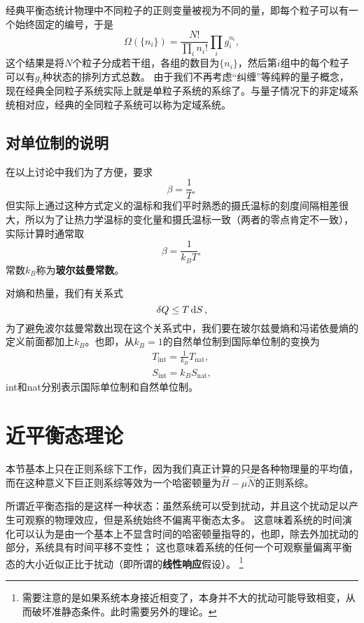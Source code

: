 \documentclass[hyperref, UTF8, a4paper]{ctexart}
\begin{document}
经典平衡态统计物理中不同粒子的正则变量被视为不同的量，即每个粒子可以有一个始终固定的编号，于是
\[
    \Omega(\{n_i\}) = \frac{N!}{\prod_i n_i!} \prod_i g_i^{n_i},
\]
这个结果是将$N$个粒子分成若干组，各组的数目为$\{n_i\}$，然后第$i$组中的每个粒子可以有$g_i$种状态的排列方式总数。
由于我们不再考虑“纠缠”等纯粹的量子概念，现在经典全同粒子系统实际上就是单粒子系统的系综了。与量子情况下的非定域系统相对应，经典的全同粒子系统可以称为定域系统。

\subsection{对单位制的说明}

在以上讨论中我们为了方便，要求
\[
    \beta = \frac{1}{T},
\]
但实际上通过这种方式定义的温标和我们平时熟悉的摄氏温标的刻度间隔相差很大，所以为了让热力学温标的变化量和摄氏温标一致（两者的零点肯定不一致），实际计算时通常取
\begin{equation}
    \beta = \frac{1}{k_B T},
\end{equation}
常数$k_B$称为\textbf{玻尔兹曼常数}。

对熵和热量，我们有关系式
\[
    \var{Q} \leq T \dd{S},
\]
为了避免波尔兹曼常数出现在这个关系式中，我们要在玻尔兹曼熵和冯诺依曼熵的定义前面都加上$k_B$。也即，从$k_B=1$的自然单位制到国际单位制的变换为
\begin{equation}
    \begin{aligned}
        T_\text{int} = \frac{1}{k_B} T_\text{nat}, \\
        S_\text{int} = k_B S_\text{nat},
    \end{aligned}
\end{equation}
int和nat分别表示国际单位制和自然单位制。

\section{近平衡态理论}


本节基本上只在正则系综下工作，因为我们真正计算的只是各种物理量的平均值，而在这种意义下巨正则系综等效为一个哈密顿量为$\hat{H}-\mu\hat{N}$的正则系综。

所谓近平衡态指的是这样一种状态：虽然系统可以受到扰动，并且这个扰动足以产生可观察的物理效应，但是系统始终不偏离平衡态太多。
这意味着系统的时间演化可以认为是由一个基本上不显含时间的哈密顿量指导的，也即，除去外加扰动的部分，系统具有时间平移不变性；
这也意味着系统的任何一个可观察量偏离平衡态的大小近似正比于扰动（即所谓的\textbf{线性响应}假设）。%
\footnote{需要注意的是如果系统本身接近相变了，本身并不大的扰动可能导致相变，从而破坏准静态条件。此时需要另外的理论。}%
\end{document}
